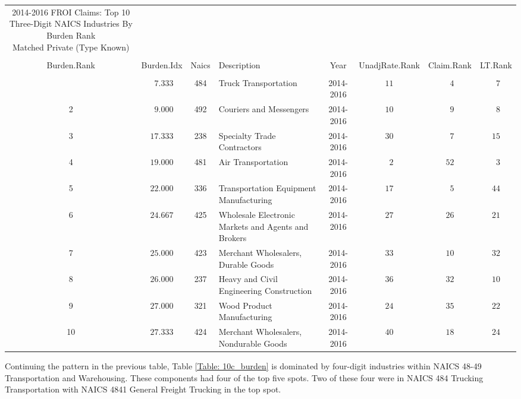 \documentclass[9pt, oneside]{article}   	%
\begin{document}
\begin{longtable}{cccp{3in}cccc}
\caption{2014-2016 FROI Claims: Top 10 Three-Digit NAICS Industries By Burden Rank\\ Matched Private (Type Known)}\\ 
\label{Table: 10b_burden}\\
\hline
\toprule
 Burden.Rank & Burden.Idx & Naics & Description & Year & UnadjRate.Rank & Claim.Rank & \multicolumn{1}{c}{LT.Rank} \\ 
   \midrule\\ [-1\normalbaselineskip]\hline\endhead\hline\endfoot
1  & $\phantom{0}7.333$ & 484 & Truck Transportation & 2014-2016 & $11$ & $\phantom{0}4$ & $\phantom{0}7$ \\
2  & $\phantom{0}9.000$ & 492 & Couriers and Messengers & 2014-2016 & $10$ & $\phantom{0}9$ & $\phantom{0}8$ \\
3  & $17.333$ & 238 & Specialty Trade Contractors & 2014-2016 & $30$ & $\phantom{0}7$ & $15$ \\
4  & $19.000$ & 481 & Air Transportation & 2014-2016 & $\phantom{0}2$ & $52$ & $\phantom{0}3$ \\
5  & $22.000$ & 336 & Transportation Equipment Manufacturing & 2014-2016 & $17$ & $\phantom{0}5$ & $44$ \\
6  & $24.667$ & 425 & Wholesale Electronic Markets and Agents and Brokers & 2014-2016 & $27$ & $26$ & $21$ \\
7  & $25.000$ & 423 & Merchant Wholesalers, Durable Goods & 2014-2016 & $33$ & $10$ & $32$ \\
8  & $26.000$ & 237 & Heavy and Civil Engineering Construction & 2014-2016 & $36$ & $32$ & $10$ \\
9  & $27.000$ & 321 & Wood Product Manufacturing & 2014-2016 & $24$ & $35$ & $22$ \\
10  & $27.333$ & 424 & Merchant Wholesalers, Nondurable Goods & 2014-2016 & $40$ & $18$ & $24$ \\
\hline 
\cline{1-1} \cline{2-2} \cline{3-3} \cline{4-4} \cline{5-5}  \cline{6-6} \cline{7-7} \cline{8-8}%
\hline 
\end{longtable}

\pagebreak

Continuing the pattern in the previous table, Table \ref{Table: 10c_burden} is dominated by four-digit industries within NAICS 48-49 Transportation and Warehousing. These components had four of the top five spots.  Two of these four were in NAICS 484 Trucking Transportation with NAICS 4841 General Freight Trucking in the top spot. 
\end{document}
